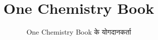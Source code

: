 \documentclass[11pt,a4paper,twoside,openany]{book}
\title{One Chemistry Book}
\author{One Chemistry Book के योगदानकर्ता}
\date{\bookdate}
\begin{document}
\frontmatter




\tableofcontents

\mainmatter



\appendix
\part{\omsolutionspart}


\backmatter
\printindex
\end{document}

